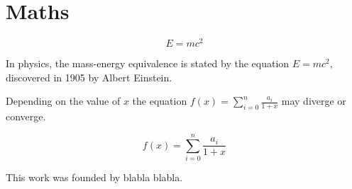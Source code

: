 \documentclass{jips}
\begin{document}
\section{Maths}

$$E=mc^2$$

In physics, the mass-energy equivalence is stated
by the equation $E=mc^2$, discovered in 1905 by Albert Einstein.

Depending on the value of $x$ the equation \( f(x) = \sum_{i=0}^{n} \frac{a_i}{1+x} \) may diverge or converge.

\[ f(x) = \sum_{i=0}^{n} \frac{a_i}{1+x} \]

\begin{ack}
This work was founded by blabla blabla.
\end{ack}




\begin{JIPSBios}
\end{JIPSBios}
\end{document}
